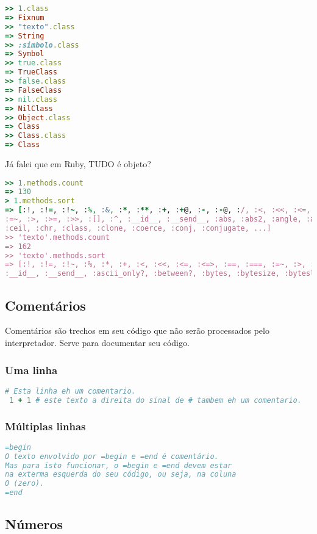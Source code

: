 \documentclass[serif,mathserif]{article}
\begin{document}
\begin{lstlisting}[language=ruby]
>> 1.class
=> Fixnum
>> "texto".class
=> String
>> :simbolo.class
=> Symbol
>> true.class
=> TrueClass
>> false.class
=> FalseClass
>> nil.class
=> NilClass
>> Object.class
=> Class
>> Class.class
=> Class
\end{lstlisting}


Já falei que em Ruby, TUDO é objeto?

\begin{lstlisting}[language=ruby]
>> 1.methods.count
=> 130
> 1.methods.sort
=> [:!, :!=, :!~, :%, :&, :*, :**, :+, :+@, :-, :-@, :/, :<, :<<, :<=, :<=>, :==, :===,
:=~, :>, :>=, :>>, :[], :^, :__id__, :__send__, :abs, :abs2, :angle, :arg, :between?,
:ceil, :chr, :class, :clone, :coerce, :conj, :conjugate, ...]
>> 'texto'.methods.count
=> 162
>> 'texto'.methods.sort
=> [:!, :!=, :!~, :%, :*, :+, :<, :<<, :<=, :<=>, :==, :===, :=~, :>, :>=, :[], :[]=,
:__id__, :__send__, :ascii_only?, :between?, :bytes, :bytesize, :byteslice, ...]
\end{lstlisting}

\subsection{Comentários}

Comentários são trechos em seu código que não serão processados pelo interpretador. Serve para documentar seu código.

\subsubsection{Uma linha}
\begin{lstlisting}[language=ruby]
 # Esta linha eh um comentario.
 1 + 1 # este texto a direita do sinal de # tambem eh um comentario.
\end{lstlisting}

\subsubsection{Múltiplas linhas}

\begin{lstlisting}[language=ruby]
=begin
O texto envolvido por =begin e =end é comentário.
Mas para isto funcionar, o =begin e =end devem estar
na exterma esquerda do seu código, ou seja, na coluna
0 (zero).
=end
\end{lstlisting}

\subsection{Números}
\end{document}
